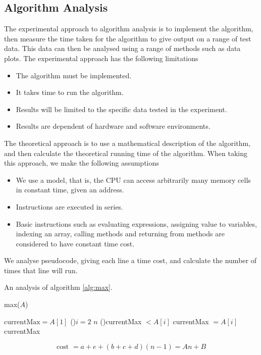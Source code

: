 \documentclass[11pt]{report}
\begin{document}
\subsection{Algorithm Analysis}
The experimental approach to algorithm analysis is to implement the algorithm, then measure the time taken for the algorithm to give output on a range of test data. This data can then be analysed using a range of methods such as data plots.
\mypar The experimental approach has the following limitations
\begin{itemize}
    \item The algorithm must be implemented.
    \item It takes time to run the algorithm.
    \item Results will be limited to the specific data tested in the experiment.
    \item Results are dependent of hardware and software environments.
\end{itemize}
The theoretical approach is to use a mathematical description of the algorithm, and then calculate the theoretical running time of the algorithm. When taking this approach, we make the following assumptions
\begin{itemize}
    \item We use a  model, that is, the CPU can access arbitrarily many memory cells in constant time, given an address.
    \item Instructions are executed in series.
    \item Basic instructions such as evaluating expressions, assigning value to variables, indexing an array, calling methods and returning from methods are considered to have constant time cost.
\end{itemize}
We analyse pseudocode, giving each line a time cost, and calculate the number of times that line will run.
\begin{eg}
    An analysis of algorithm \ref{alg:max}.
    \begin{algorithm}
        \caption{max($A$)} 
        $\text{currentMax} = A[1]$
        \For(){$i = 2$ \KwTo $n$}
        {\If(){currentMax $< A[i]$}
            {
                currentMax $= A[i]$ 
            }
        }
        \Return currentMax 
    \end{algorithm}
    \[\text{cost } = a+e + (b+c+d)(n-1) = An + B  \]
\end{eg}
\pagebreak
\end{document}
